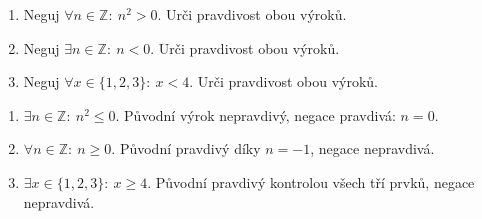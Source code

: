 \documentclass[11pt,a4paper]{article}
\begin{document}


\begin{zadaniReseniBox}[title={Domácí úkol},breakable=false]
\begin{enumerate}[label=\alph*)]
\item Neguj $\forall n\in\mathbb Z:\ n^2>0$. Urči pravdivost obou výroků.
\item Neguj $\exists n\in\mathbb Z:\ n<0$. Urči pravdivost obou výroků.
\item Neguj $\forall x\in\{1,2,3\}:\ x<4$. Urči pravdivost obou výroků.
\end{enumerate}
\tcblower
\begin{enumerate}[label=\alph*)]
\item $\exists n\in\mathbb Z:\ n^2\le0$. Původní výrok nepravdivý, negace pravdivá: $n=0$.
\item $\forall n\in\mathbb Z:\ n\ge0$. Původní pravdivý díky $n=-1$, negace nepravdivá.
\item $\exists x\in\{1,2,3\}:\ x\ge4$. Původní pravdivý kontrolou všech tří prvků, negace nepravdivá.
\end{enumerate}
\end{zadaniReseniBox}
\end{document}
